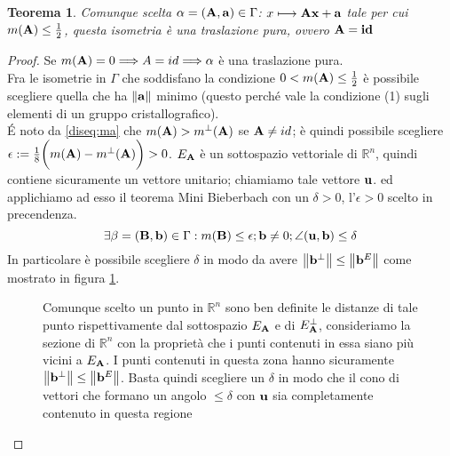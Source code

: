 \documentclass[a4paper,11pt,openright,twoside	]{book}
\newtheorem{theorem}{Teorema}[section]
\begin{document}
\begin{theorem}
 Comunque scelta $\alpha = (\vb{A, a}) \in \Gamma$:  $x \longmapsto \vb{Ax +a} $  tale per cui $m(\vb{A}) \leq \frac{1}{2} $, questa isometria è una traslazione pura, ovvero $\vb{A} = \vb{id}$
\end{theorem}

\begin{proof}
Se $m(\vb{A}) = 0 \Longrightarrow A = id \Longrightarrow \alpha$ è una traslazione pura. \\
Fra le isometrie in $\Gamma$ che soddisfano la condizione  $ 0 < m(\vb{A}) \leq \frac{1}{2}$ è possibile scegliere quella che ha $\norm{\vb{a}}$ minimo (questo perché vale la condizione (1) sugli elementi di un gruppo cristallografico). \\
\'E noto da \ref{diseq:ma} che $m(\vb{A}) > m^{\perp}(\vb{A})$ se  $\vb{A} \neq id$; è quindi possibile scegliere  $\epsilon := \frac{1}{8} \bigg( m(\vb{A}) - m^{\perp}(\vb{A}) \bigg) >0$.
$E_{\vb{A}}$ è un sottospazio vettoriale di $\mathbb{R}^n$, quindi contiene sicuramente un vettore unitario; chiamiamo tale vettore $\vb{u}$.  ed applichiamo ad esso il teorema Mini Bieberbach con un $\delta >0$, l'$\epsilon >0 $ scelto in precendenza. \\
\[ \exists \beta = (\vb{B, b}) \in \Gamma : m(\vb{B}) \leq \epsilon ; \vb{b} \neq 0 ; \angle(\vb{u, b})  \leq \delta \]
In particolare è possibile scegliere $\delta $ in modo da avere $\norm{\vb{b}^{\perp}} \leq \norm{\vb{b}^E}$ come mostrato in figura \ref{fig:ea}. \\
\begin{figure}[h!]
\centering
{}
\caption{Comunque scelto un punto in $\mathbb{R}^n$ sono ben definite le distanze di tale punto rispettivamente dal sottospazio $E_{\vb{A}}$ e di $E_{\vb{A}}^{\perp}$, consideriamo la sezione di $\mathbb{R}^n$ con la proprietà che i punti contenuti in essa siano più vicini a $E_{\vb{A}}$. I punti contenuti in questa zona hanno sicuramente  $\norm{\vb{b}^{\perp}} \leq \norm{\vb{b}^E}$. Basta quindi scegliere un $\delta$ in modo che il cono di vettori che formano un angolo $\leq \delta$ con $\vb{u} $ sia completamente contenuto in questa regione}
\label{fig:ea}
\end{figure}


\end{proof}
\end{document}
